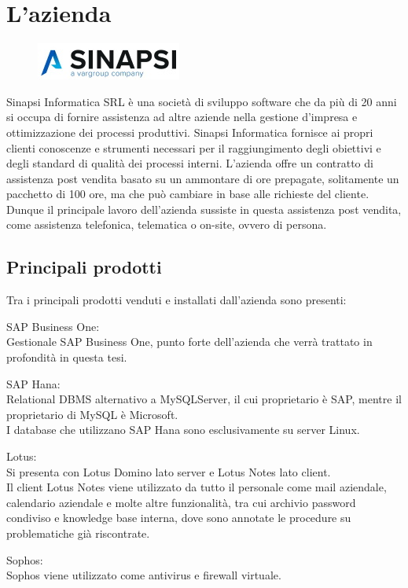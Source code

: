 

\section{L'azienda}
\begin{figure}[!h] 
	\centering 
	\includegraphics{immagini/logo_sinapsi.jpg} 
\end{figure}
Sinapsi Informatica SRL è una società di sviluppo software che da più di 20 anni si occupa di fornire assistenza ad altre aziende nella gestione d'impresa e ottimizzazione dei processi produttivi.
Sinapsi Informatica fornisce ai propri clienti conoscenze e strumenti necessari per il raggiungimento degli obiettivi e degli standard di qualità dei processi interni.
L'azienda offre un contratto di assistenza post vendita basato su un ammontare di ore prepagate, solitamente un pacchetto di 100 ore, ma che può cambiare in base alle richieste del cliente.
Dunque il principale lavoro dell'azienda sussiste in questa assistenza post vendita, come assistenza telefonica, telematica o on-site, ovvero di persona.
\subsection{Principali prodotti}
Tra i principali prodotti venduti e installati dall'azienda sono presenti:
\begin{description}
	\item {SAP Business One:} \\Gestionale SAP Business One, punto forte dell'azienda che verrà trattato in profondità in questa tesi.
	\item {SAP Hana:} \\Relational DBMS alternativo a MySQLServer, il cui proprietario è SAP, mentre il proprietario di MySQL è Microsoft.\\I database che utilizzano SAP Hana sono esclusivamente su server Linux.
	\item {Lotus:} \\Si presenta con Lotus Domino lato server e Lotus Notes lato client.\\Il client Lotus Notes viene utilizzato da tutto il personale come mail aziendale, calendario aziendale e molte altre funzionalità, tra cui archivio password condiviso e knowledge base interna, dove sono annotate le procedure su problematiche già riscontrate.
	\item {Sophos:} \\Sophos viene utilizzato come antivirus e firewall virtuale.
\end{description}



